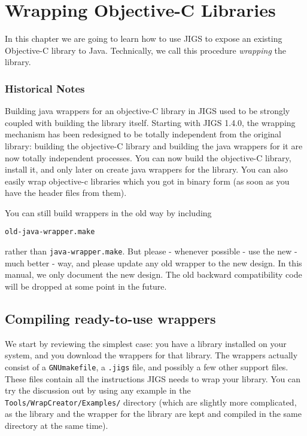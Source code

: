 \chapter{Wrapping Objective-C Libraries}

In this chapter we are going to learn how to use JIGS to expose an
existing Objective-C library to Java.  Technically, we call this
procedure {\sl wrapping} the library.

\subsection{Historical Notes}
Building java wrappers for an objective-C library in JIGS used to be
strongly coupled with building the library itself.  Starting with JIGS
1.4.0, the wrapping mechanism has been redesigned to be totally
independent from the original library: building the objective-C
library and building the java wrappers for it are now totally
independent processes.  You can now build the objective-C library,
install it, and only later on create java wrappers for the library.
You can also easily wrap objective-c libraries which you got in binary
form (as soon as you have the header files from them).

You can still build wrappers in the old way by including
\begin{verbatim}
old-java-wrapper.make
\end{verbatim}
rather than \texttt{java-wrapper.make}.  But please - whenever
possible - use the new - much better - way, and please update any old
wrapper to the new design.  In this manual, we only document the new
design.  The old backward compatibility code will be dropped at some
point in the future.

\section{Compiling ready-to-use wrappers}

We start by reviewing the simplest case: you have a library installed
on your system, and you download the wrappers for that library.  The
wrappers actually consist of a \texttt{GNUmakefile}, a \texttt{.jigs}
file, and possibly a few other support files.  These files contain all
the instructions JIGS needs to wrap your library.  You can try the
discussion out by using any example in the
\texttt{Tools/WrapCreator/Examples/} directory (which are slightly
more complicated, as the library and the wrapper for the library are
kept and compiled in the same directory at the same time).

